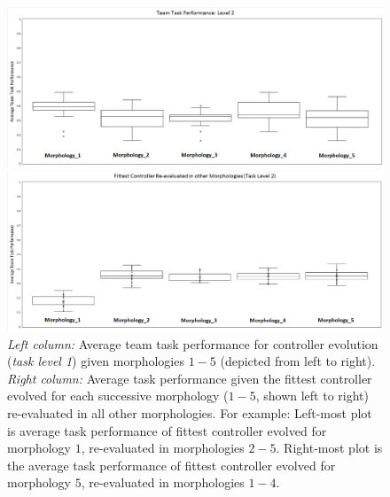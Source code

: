 \documentclass[conference]{IEEEtran}
\begin{document}
\begin{figure}[t]
	\begin{minipage}{0.5\textwidth}
		\includegraphics[width=\textwidth]{Evo_BoxPlot_Level2.eps}
	\end{minipage}
	\begin{minipage}{0.5\textwidth}
		\includegraphics[width=\textwidth]{Level2_ReEval.eps}
	\end{minipage}
\caption{\textit{Left column:} Average team task performance for controller evolution (\textit{task level 1})
given morphologies $1-5$ (depicted from left to right).
\textit{Right column:} Average task performance given the fittest controller evolved
for each successive morphology ($1-5$, shown left to right) re-evaluated in all other morphologies.
For example: Left-most plot is average task performance of fittest controller evolved for
morphology $1$, re-evaluated in morphologies $2-5$.  Right-most plot is the average task performance
of fittest controller evolved for morphology $5$, re-evaluated in morphologies $1-4$.}\label{fig:level2results}
\end{figure}
\end{document}
